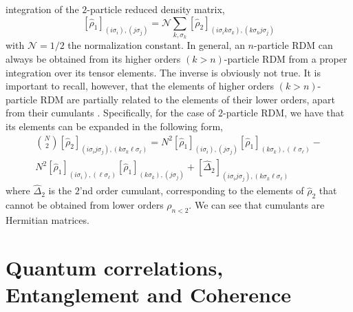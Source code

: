 \documentclass[prb,reprint,showpacs,twocolumn,superscriptaddress]{revtex4-2}
\begin{document}
integration of the $2$-particle reduced density matrix, 
\begin{equation}
 \left[\hat \rho_{1}\right]_{\left(i\sigma_{i}\right),\left(j\sigma_{j}\right)} = \mathcal{N}
 \sum_{k,\sigma_k}
 \left[\hat \rho_{2}\right]_{\left(i\sigma_{i} k\sigma_{k}\right),\left(k\sigma_{k} j\sigma_{j}\right)} 
\end{equation}
with $\mathcal{N}=1/2$ the normalization constant.
In general, an $n$-particle RDM can always be obtained from its higher orders $(k>n)$-particle RDM 
from a proper integration over its tensor elements. The inverse is obviously not true. 
It is important to recall, however, that the elements of higher orders $(k>n)$-particle RDM are 
partially related to the elements of their lower orders, apart from their cumulants \cite{kubo62}. 
Specifically, for the case of $2$-particle RDM, we have that its elements 
can be expanded in the following form,
\begin{eqnarray}
 \binom{N}{2}\left[\hat \rho_{2}\right]_{\left(i\sigma_{i}j\sigma_{j}\right),\left(k\sigma_{k}\ell\sigma_{\ell}\right)}
 =
 N^{2}\left[\hat \rho_{1}\right]_{\left(i\sigma_{i}\right),\left(j\sigma_{j}\right)}
 \left[\hat \rho_{1}\right]_{\left(k\sigma_{k}\right),\left(\ell\sigma_{\ell}\right)}
 - \nonumber \\
 N^{2}\left[\hat \rho_{1}\right]_{\left(i\sigma_{i}\right),\left(\ell\sigma_{\ell}\right)}
 \left[\hat \rho_{1}\right]_{\left(k\sigma_{k}\right),\left(j\sigma_{j}\right)}
  + \left[\hat \Delta_2 \right]_{\left(i\sigma_{i}j\sigma_{j}\right),\left(k\sigma_{k}\ell\sigma_{\ell}\right)} 
  \label{eq.cumulant}
\end{eqnarray}
where $\hat \Delta_2$ is the $2$'nd order cumulant, 
corresponding to the elements of $\hat \rho_{2}$ that cannot be obtained from lower orders $\rho_{n<2}$. 
We can see that cumulants are Hermitian matrices.

\section{Quantum correlations, Entanglement and Coherence}
\label{sec.qc}
\end{document}
